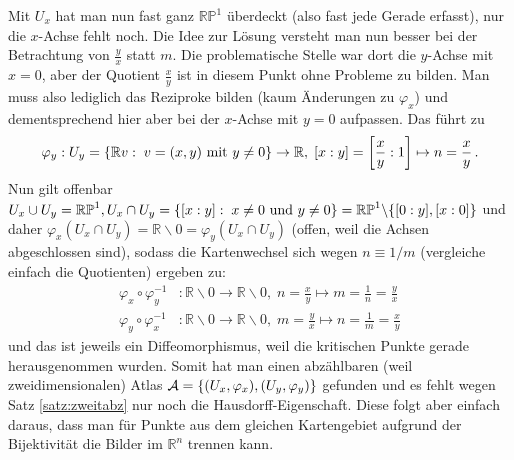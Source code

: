 \documentclass[../H_Analysis_main.tex]{subfiles}
\begin{document}
\begin{bsp}
Mit $U_x$ hat man nun fast ganz $\mathbb{RP}^1$ überdeckt (also fast jede Gerade erfasst), nur die $x$-Achse fehlt noch. Die Idee zur Lösung versteht man nun besser bei der Betrachtung von $\frac{y}{x}$ statt $m$. Die problematische Stelle war dort die $y$-Achse mit $x = 0$, aber der Quotient $\frac{x}{y}$ ist in diesem Punkt ohne Probleme zu bilden. Man muss also lediglich das Reziproke bilden (kaum Änderungen zu $\varphi_x$) und dementsprechend hier aber bei der $x$-Achse mit $y = 0$ aufpassen. Das führt zu
\begin{equation}
\varphi_y: U_y = \qty{\mathbb{R} v: \; v = (x, y) \text{ mit } y \neq 0} \rightarrow \mathbb{R}, \; [x : y] = \qty[\frac{x}{y} : 1] \mapsto n = \frac{x}{y} \, .
\end{equation}
Nun gilt offenbar $U_x \cup U_y = \mathbb{RP}^1, U_x \cap U_y = \qty{[x : y]: \; x \neq 0 \text{ und } y \neq 0} = \mathbb{RP}^1 \backslash \qty{[0 : y], [x : 0]}$ und daher $\varphi_x(U_x \cap U_y) = \mathbb{R} \backslash \qty{0} = \varphi_y(U_x \cap U_y)$ (offen, weil die Achsen abgeschlossen sind), sodass die Kartenwechsel sich wegen $n \equiv 1/ m$ (vergleiche einfach die Quotienten) ergeben zu:
\begin{equation}
\begin{split}
\varphi_x \circ \varphi_y^{-1}&: \mathbb{R} \backslash \qty{0} \rightarrow \mathbb{R} \backslash \qty{0}, \; n = \frac{x}{y} \mapsto m = \frac{1}{n} = \frac{y}{x}
\\
\varphi_y \circ \varphi_x^{-1}&: \mathbb{R} \backslash \qty{0} \rightarrow \mathbb{R} \backslash \qty{0}, \; m = \frac{y}{x} \mapsto n = \frac{1}{m} = \frac{x}{y}
\end{split}
\end{equation}
und das ist jeweils ein Diffeomorphismus, weil die kritischen Punkte gerade herausgenommen wurden. Somit hat man einen abzählbaren (weil zweidimensionalen) Atlas $\mathcal{A} = \qty{(U_x, \varphi_x), (U_y, \varphi_y)}$ gefunden und es fehlt wegen Satz \ref{satz:zweitabz} nur noch die Hausdorff-Eigenschaft. Diese folgt aber einfach daraus, dass man für Punkte aus dem gleichen Kartengebiet aufgrund der Bijektivität die Bilder im $\mathbb{R}^n$ trennen kann.\\



\end{bsp}
\end{document}

